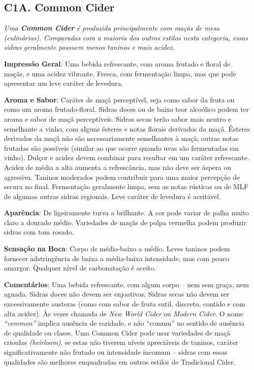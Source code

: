 \subsection*{C1A. Common Cider}

\textit{Uma \textbf{Common Cider} é produzida principalmente com maçãs de mesa (culinárias). Comparadas com a maioria dos outros estilos nesta categoria, essas sidras geralmente possuem menos taninos e mais acidez.}

\textbf{Impressão Geral}: Uma bebida refrescante, com aroma frutado e floral de maçãs, e uma acidez vibrante. Fresca, com fermentação limpa, mas que pode apresentar um leve caráter de levedura.

\textbf{Aroma e Sabor}: Caráter de maçã perceptível, seja como sabor da fruta ou como um aroma frutado-floral. Sidras doces ou de baixo teor alcoólico podem ter aroma e sabor de maçã perceptíveis. Sidras secas terão sabor mais neutro e semelhante a vinho, com alguns ésteres e notas florais derivados da maçã. Ésteres derivados da maçã não são necessariamente semelhantes à maçã; outras notas frutadas são possíveis (similar ao que ocorre quando uvas são fermentadas em vinho). Dulçor e acidez devem combinar para resultar em um caráter refrescante. Acidez de média a alta aumenta a refrescância, mas não deve ser áspera ou agressiva. Taninos moderados podem contribuir para uma maior percepção de secura no final. Fermentação geralmente limpa, sem as notas rústicas ou de MLF de algumas outras sidras regionais. Leve caráter de levedura é aceitável.

\textbf{Aparência}: De ligeiramente turva a brilhante. A cor pode variar de palha muito claro a dourado médio. Variedades de maçãs de polpa vermelha podem produzir sidras com tom rosado.

\textbf{Sensação na Boca}: Corpo de médio-baixo a médio. Leves taninos podem fornecer adstringência de baixa a média-baixa intensidade, mas com pouco amargor. Qualquer nível de carbonatação é aceito.

\textbf{Comentários}: Uma bebida refrescante, com algum corpo – nem sem graça, nem aguada. Sidras doces não devem ser enjoativas. Sidras secas não devem ser excessivamente austeras (como com sabor de fruta sutil, discreto, contido e com alta acidez). Às vezes chamada de \textit{New World Cider} ou \textit{Modern Cider}. O nome \textit{“common”} implica ausência de raridade, e não “comum” no sentido de ausência de qualidade ou classe. Uma Common Cider pode usar variedades de maçã crioulas \textit{(heirloom)}, se estas não tiverem níveis apreciáveis de taninos, caráter significativamente não frutado ou intensidade incomum – sidras com essas qualidades são melhores enquadradas em outros estilos de Tradicional Cider.

